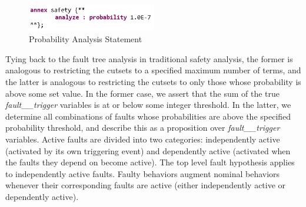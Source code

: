 \begin{figure}[h!]
	\vspace{-0.1in}
	\begin{center}
		\includegraphics[width=0.5\textwidth]{images/hypothesisProb.png}
	\end{center}
	\vspace{-0.1in}
	\caption{Probability Analysis Statement}
	\label{fig:hypothesisProb}
\end{figure}

Tying back to the fault tree analysis in traditional safety analysis, the former is analogous to restricting the cutsets to a specified maximum number of terms, and the latter is analogous to restricting the cutsets to only those whose probability is above some set value. In the former case, we assert that the sum of the true {\em fault\_\_trigger} variables is at or below some integer threshold.  In the latter, we determine all combinations of faults whose probabilities are above the specified probability threshold, and describe this as a proposition over {\em fault\_\_trigger} variables. 
%
Active faults are divided into two categories: independently active (activated by its own triggering event) and dependently active (activated when the faults they depend on become active). The top level fault hypothesis applies to independently active faults. Faulty behaviors augment nominal behaviors whenever their corresponding faults are active (either independently active or dependently active).

